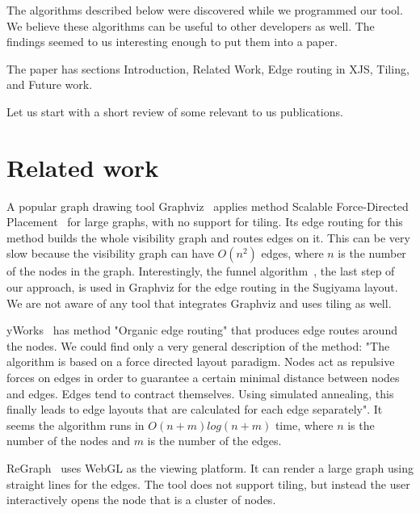 \documentclass{gd-llncs}
\begin{document}
The algorithms described below were discovered while we programmed our tool. We believe these
algorithms can be useful to other developers as well. The findings seemed to us interesting
enough to put them into a paper.

The paper has sections Introduction, Related Work, Edge routing in XJS, Tiling, and Future work.



Let us start with a short review of some relevant to us publications.
\section*{Related work}\label{relwork}
A popular graph drawing tool Graphviz~\cite{graphviz} applies method
Scalable Force-Directed Placement~\cite{sfdp} for large graphs, with no
support for tiling. Its edge routing for this method builds the whole
visibility graph and routes edges on it. This can be very slow because the visibility graph can have $O(n^2)$ edges, where $n$ is the number of the nodes in the graph.
Interestingly, the funnel algorithm~\cite{chazelle1982theorem,hershberger1994computing},
the last step of our approach, is used in Graphviz for the edge routing in the
Sugiyama layout. We are not aware of any tool that integrates Graphviz
and uses tiling as well.

yWorks~\cite{yworks} has method "Organic edge routing" that produces edge
routes around the nodes. We could find only
a very general description of the method: "The algorithm is based on a force
directed layout paradigm. Nodes act as repulsive forces on edges in order to
guarantee a certain minimal distance between nodes and edges. Edges tend to contract
themselves. Using simulated annealing, this finally leads to edge layouts that
are calculated for each edge separately". It seems the algorithm runs in $O(n+m)log(n+m)$
time, where $n$ is the number of the nodes and $m$ is the number of the edges.

ReGraph~\cite{regraph} uses WebGL as the viewing platform. It can render a large
graph using straight lines for the edges. The tool does not support tiling, but instead
the user interactively opens the node that is a cluster of nodes.
\end{document}
